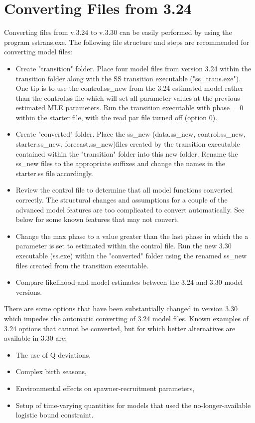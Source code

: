 \hypertarget{ConvIssues}{}
\section{Converting Files from 3.24}
Converting files from v.3.24 to v.3.30 can be easily performed by using the program sstrans.exe. The following file structure and steps are recommended for converting model files:
\begin{itemize}
	\item Create "transition" folder.  Place four model files from version 3.24 within the transition folder along with the SS transition executable ("ss\_trans.exe").  One tip is to use the control.ss\_new from the 3.24 estimated model rather than the control.ss file which will set all parameter values at the previous estimated MLE parameters.  Run the transition executable with phase = 0 within the starter file, with the read par file turned off (option 0).
	\item Create "converted" folder.  Place the ss\_new (data.ss\_new, control.ss\_new, starter.ss\_new, forecast.ss\_new)files created by the transition executable contained within the "transition" folder into this new folder.  Rename the ss\_new files to the appropriate suffixes and change the names in the starter.ss file accordingly.
	\item Review the control file to determine that all model functions converted correctly.  The structural changes and assumptions for a couple of the advanced model features are too complicated to convert automatically.  See below for some known features that may not convert.
	\item Change the max phase to a value greater than the last phase in which the a parameter is set to estimated within the control file.  Run the new 3.30 executable (ss.exe) within the "converted" folder using the renamed ss\_new files created from the transition executable.
	\item Compare likelihood and model estimates between the 3.24 and 3.30 model versions.
\end{itemize}

\noindent There are some options that have been substantially changed in version 3.30 which impedes the automatic converting of 3.24 model files. Known examples of 3.24 options that cannot be converted, but for which better alternatives are available in 3.30 are:
\begin{itemize}
	\item The use of Q deviations,
	\item Complex birth seasons,
	\item Environmental effects on spawner-recruitment parameters,
	\item Setup of time-varying quantities for models that used the no-longer-available logistic bound constraint.
\end{itemize}
